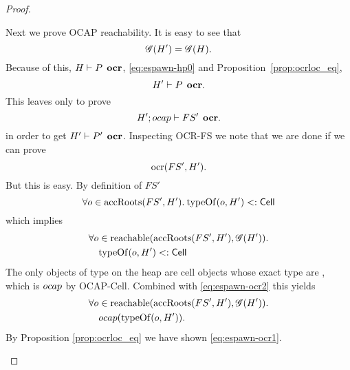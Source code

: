 \begin{proof}
\begin{description}
      Next we prove OCAP reachability. It is easy to see that
      \begin{equation} \label{eq:espawn-ocr0}
        \mathscr{G}(H') = \mathscr{G}(H).
      \end{equation}
      Because of this, $H \vdash P \:\: \mbox{\bf ocr}$, \eqref{eq:espawn-hp0} and
      Proposition~\ref{prop:ocrloc_eq},
      \begin{equation}
        H' \vdash P \:\: \mbox{\bf ocr}.
      \end{equation}
      This leaves only to prove
      \begin{equation}
        H'; \mbox{$ocap$} \vdash FS' \:\: \mbox{\bf ocr}.
      \end{equation}
      in order to get $H' \vdash P' \:\: \mbox{\bf ocr}$.
      Inspecting {\sc OCR-FS} we note that we are done if we can prove
      \begin{equation} \label{eq:espawn-ocr1}
        \mbox{$\mathrm{ocr}$}(FS', H').
      \end{equation}
      But this is easy. By definition of $FS'$
      \begin{equation}
        \forall o \in \mbox{$\mathrm{accRoots}$}(FS', H'). \: \mbox{$\mathrm{typeOf}$}(o, H') <: \mbox{$\mathsf{Cell}$}
      \end{equation}
      which implies
      \begin{equation} \label{eq:espawn-ocr2}
        \begin{aligned}
          \forall o &\in \mbox{$\mathrm{reachable}$}(\mbox{$\mathrm{accRoots}$}(FS', H'), \mathscr{G}(H')). \\
            &\mbox{$\mathrm{typeOf}$}(o, H') <: \mbox{$\mathsf{Cell}$}
        \end{aligned}
      \end{equation}
      The only objects of type \CellType{} on the heap are cell objects 
      whose exact type are \CellType{}, which is $\mbox{$ocap$}$ by {\sc OCAP-Cell}.
      Combined with \eqref{eq:espawn-ocr2} this yields
      \begin{equation}
        \begin{aligned}
          \forall o &\in \mbox{$\mathrm{reachable}$}(\mbox{$\mathrm{accRoots}$}(FS', H'), \mathscr{G}(H')). \\
            &\mbox{$ocap$}(\mbox{$\mathrm{typeOf}$}(o, H')).
        \end{aligned}
      \end{equation}
      By Proposition \ref{prop:ocrloc_eq} we have shown \eqref{eq:espawn-ocr1}.


\end{description}
\end{proof}
